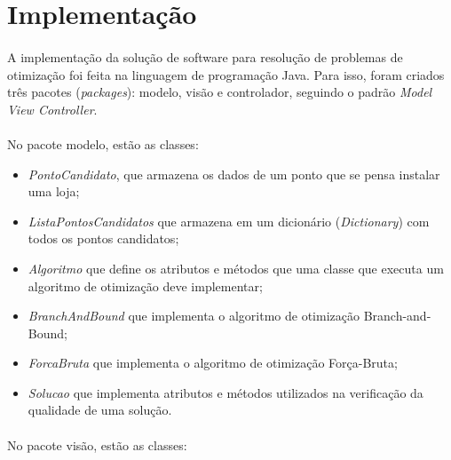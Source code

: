\documentclass[12pt]{article}
\begin{document}
\section{Implementação}

\paragraph{}A implementação da solução de software para resolução de problemas de otimização foi feita na linguagem de programação Java. Para isso, foram criados três pacotes (\textit{packages}): modelo, visão e controlador, seguindo o padrão \textit{Model View Controller}.

\paragraph{}No pacote modelo, estão as classes:

\begin{itemize}
    \item \textit{PontoCandidato}, que armazena os dados de um ponto que se pensa instalar uma loja; 
    \item \textit{ListaPontosCandidatos} que armazena em um dicionário (\textit{Dictionary}) com todos os pontos candidatos;
    \item \textit{Algoritmo} que define os atributos e métodos que uma classe que executa um algoritmo de otimização deve implementar;
    \item \textit{BranchAndBound} que implementa o algoritmo de otimização Branch-and-Bound;
    \item \textit{ForcaBruta} que implementa o algoritmo de otimização Força-Bruta;
    \item \textit{Solucao} que implementa atributos e métodos utilizados na verificação da qualidade de uma solução.
\end{itemize}

\paragraph{}No pacote visão, estão as classes:
\end{document}

